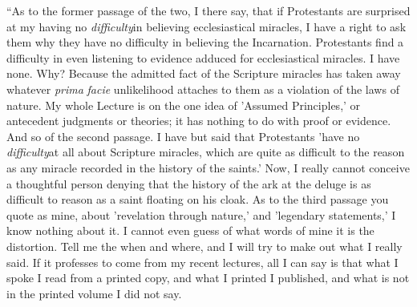 ``As to the former passage of the two, I there
say, that if Protestants are surprised at my having no \emph{difficulty}in believing ecclesiastical miracles, I have a right
to ask them why they have no difficulty in believing the
Incarnation. Protestants find a difficulty in even
listening to evidence adduced for ecclesiastical
miracles. I have none. Why? Because the admitted fact of
the Scripture miracles has taken away whatever \emph{prima}
\emph{facie} unlikelihood attaches to them as a violation
of the laws of nature. My whole Lecture is on the one
idea of 'Assumed Principles,' or antecedent judgments or
theories; it has nothing to do with proof or evidence.
And so of the second passage. I have but said that
Protestants 'have no \emph{difficulty}at all about
Scripture miracles, which are quite as difficult to the
reason as any miracle recorded in the history of the
saints.' Now, I really cannot conceive a thoughtful
person denying that the history of the ark at the deluge
is as difficult to reason as a saint floating on his
cloak. As to the third passage you quote as mine, about
'revelation through nature,' and 'legendary statements,'
I know nothing about it. I cannot even guess of what
words of mine it is the distortion. Tell me the when and
where, and I will try to make out what I really said. If
it professes to come from my recent lectures, all I can
say is that what I spoke I read from a printed copy, and
what I printed I published, and what is not in the
printed volume I did not say.


